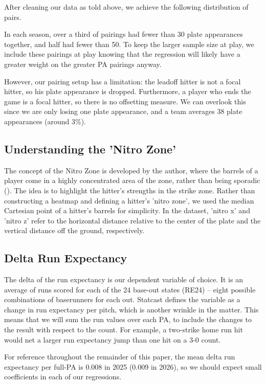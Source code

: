 \documentclass{article}
\newcommand{\tbl}[1]{}
\begin{document}
After cleaning our data as told above, we achieve the following distribution of pairs.

\tbl{pair_pa_distribution}

In each season, over a third of pairings had fewer than 30 plate appearances together, and half had fewer than 50. To keep the larger sample size at play, we include these pairings at play knowing that the regression will likely have a greater weight on the greater PA pairings anyway.

However, our pairing setup has a limitation: the leadoff hitter is not a focal hitter, so his plate appearance is dropped. Furthermore, a player who ends the game is a focal hitter, so there is no offsetting measure. We can overlook this since we are only losing one plate appearance, and a team averages 38 plate appearances (around 3\%).

\subsection{Understanding the 'Nitro Zone'}

The concept of the Nitro Zone is developed by the author, where the barrels of a player come in a highly concentrated area of the zone, rather than being sporadic (\cite{correa2021dalbec}). The idea is to highlight the hitter's strengths in the strike zone. Rather than constructing a heatmap and defining a hitter's 'nitro zone', we used the median Cartesian point of a hitter's barrels for simplicity. In the dataset, 'nitro x' and 'nitro z' refer to the horizontal distance relative to the center of the plate and the vertical distance off the ground, respectively.

\subsection{Delta Run Expectancy}

The delta of the run expectancy is our dependent variable of choice. It is an average of runs scored for each of the 24 base-out states (RE24) -- eight possible combinations of baserunners for each out. Statcast defines the variable as a change in run expectancy per pitch, which is another wrinkle in the matter. This means that we will sum the run values over each PA, to include the changes to the result with respect to the count. For example, a two-strike home run hit would net a larger run expectancy jump than one hit on a 3-0 count.

For reference throughout the remainder of this paper, the mean delta run expectancy per full-PA is 0.008 in 2025 (0.009 in 2026), so we should expect small coefficients in each of our regressions.
\end{document}
